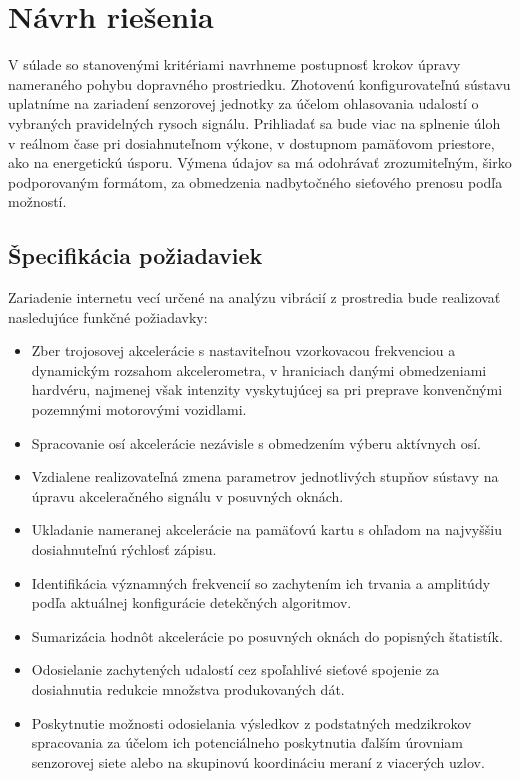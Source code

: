 \chapter{Návrh riešenia}
V súlade so stanovenými kritériami navrhneme postupnosť krokov úpravy nameraného pohybu dopravného prostriedku. 
Zhotovenú konfigurovateľnú sústavu uplatníme na zariadení senzorovej jednotky za účelom ohlasovania udalostí 
o vybraných pravidelných rysoch signálu. Prihliadať sa bude viac na splnenie úloh v reálnom čase pri
dosiahnuteľnom výkone, v dostupnom pamäťovom priestore, ako na energetickú úsporu. Výmena údajov sa má 
odohrávať zrozumiteľným, širko podporovaným formátom, za obmedzenia nadbytočného sieťového prenosu 
podľa možností.


\section{Špecifikácia požiadaviek}
Zariadenie internetu vecí určené na analýzu vibrácií z prostredia bude realizovať nasledujúce funkčné požiadavky: 
\begin{itemize}[noitemsep,topsep=0pt]
\item Zber trojosovej akcelerácie s nastaviteľnou vzorkovacou frekvenciou a dynamickým rozsahom akcelerometra, v hraniciach danými 
obmedzeniami hardvéru, najmenej však intenzity vyskytujúcej sa pri preprave konvenčnými pozemnými motorovými vozidlami.
\item Spracovanie osí akcelerácie nezávisle s obmedzením výberu aktívnych osí.
\item Vzdialene realizovateľná zmena parametrov jednotlivých stupňov sústavy na úpravu akceleračného signálu v posuvných oknách.
\item Ukladanie nameranej akcelerácie na pamäťovú kartu s ohľadom na najvyššiu dosiahnuteľnú rýchlosť zápisu.
\item Identifikácia významných frekvencií so zachytením ich trvania a amplitúdy podľa aktuálnej 
konfigurácie detekčných algoritmov.
\item Sumarizácia hodnôt akcelerácie po posuvných oknách do popisných štatistík.
\item Odosielanie zachytených udalostí cez spoľahlivé sieťové spojenie za dosiahnutia redukcie množstva produkovaných dát.
\item Poskytnutie možnosti odosielania výsledkov z podstatných medzikrokov spracovania za účelom ich potenciálneho poskytnutia 
ďalším úrovniam senzorovej siete alebo na skupinovú koordináciu meraní z viacerých uzlov. 
\end{itemize}
\bigskip

